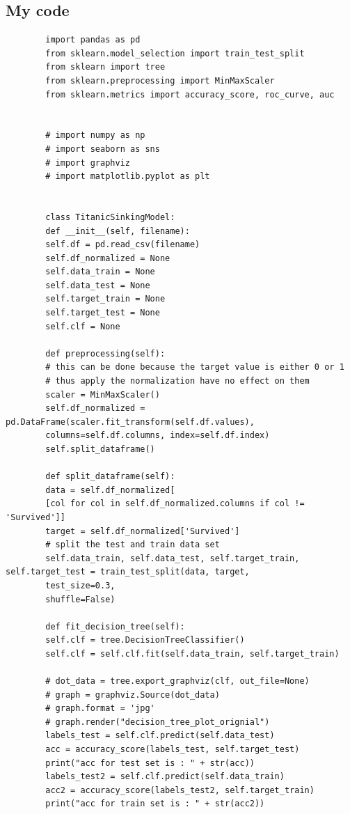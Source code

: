 \documentclass[12pt]{article}
\begin{document}
    \subsection{My code}\label{subsec:my-code}
    \begin{lstlisting}
        import pandas as pd
        from sklearn.model_selection import train_test_split
        from sklearn import tree
        from sklearn.preprocessing import MinMaxScaler
        from sklearn.metrics import accuracy_score, roc_curve, auc


        # import numpy as np
        # import seaborn as sns
        # import graphviz
        # import matplotlib.pyplot as plt


        class TitanicSinkingModel:
        def __init__(self, filename):
        self.df = pd.read_csv(filename)
        self.df_normalized = None
        self.data_train = None
        self.data_test = None
        self.target_train = None
        self.target_test = None
        self.clf = None

        def preprocessing(self):
        # this can be done because the target value is either 0 or 1
        # thus apply the normalization have no effect on them
        scaler = MinMaxScaler()
        self.df_normalized = pd.DataFrame(scaler.fit_transform(self.df.values),
        columns=self.df.columns, index=self.df.index)
        self.split_dataframe()

        def split_dataframe(self):
        data = self.df_normalized[
        [col for col in self.df_normalized.columns if col != 'Survived']]
        target = self.df_normalized['Survived']
        # split the test and train data set
        self.data_train, self.data_test, self.target_train, self.target_test = train_test_split(data, target,
        test_size=0.3,
        shuffle=False)

        def fit_decision_tree(self):
        self.clf = tree.DecisionTreeClassifier()
        self.clf = self.clf.fit(self.data_train, self.target_train)

        # dot_data = tree.export_graphviz(clf, out_file=None)
        # graph = graphviz.Source(dot_data)
        # graph.format = 'jpg'
        # graph.render("decision_tree_plot_orignial")
        labels_test = self.clf.predict(self.data_test)
        acc = accuracy_score(labels_test, self.target_test)
        print("acc for test set is : " + str(acc))
        labels_test2 = self.clf.predict(self.data_train)
        acc2 = accuracy_score(labels_test2, self.target_train)
        print("acc for train set is : " + str(acc2))


\end{lstlisting}
\end{document}
